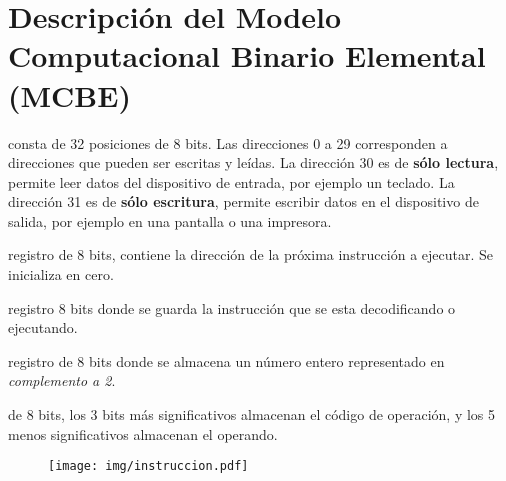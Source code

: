 \documentclass[12pt]{article}
\begin{document}
\appendix
\clearpage
\addappheadtotoc
\appendixpage

\section*{Descripción del Modelo Computacional Binario Elemental (MCBE)}

\begin{description}
    \itemsep2pt \parskip0pt 

    \item[Memoria:] consta de 32 posiciones de 8 bits. Las direcciones 0 a 29
        corresponden a direcciones que pueden ser escritas y leídas. La
        dirección 30 es de \textbf{sólo lectura}, permite leer datos del
        dispositivo de entrada, por ejemplo un teclado. La dirección 31 es de
        \textbf{sólo escritura}, permite escribir datos en el dispositivo de
        salida, por ejemplo en una pantalla o una impresora.

    \item[Registro PC:] registro de 8 bits, contiene la dirección de la
        próxima instrucción a ejecutar. Se inicializa en cero.

    \item[Registro IR:] registro 8 bits donde se guarda la instrucción que se
        esta decodificando o ejecutando.

    \item[Registro acumulador:] registro de 8 bits donde se almacena un
        número entero representado en \emph{complemento a 2}.

    \item[Instrucciones:] de 8 bits, los 3 bits más significativos almacenan
        el código de operación, y los 5 menos significativos almacenan el
        operando.

        \begin{figure}[h]
            \centering
            \texttt{[image: img/instruccion.pdf]}
        \end{figure}

\end{description}
\end{document}
